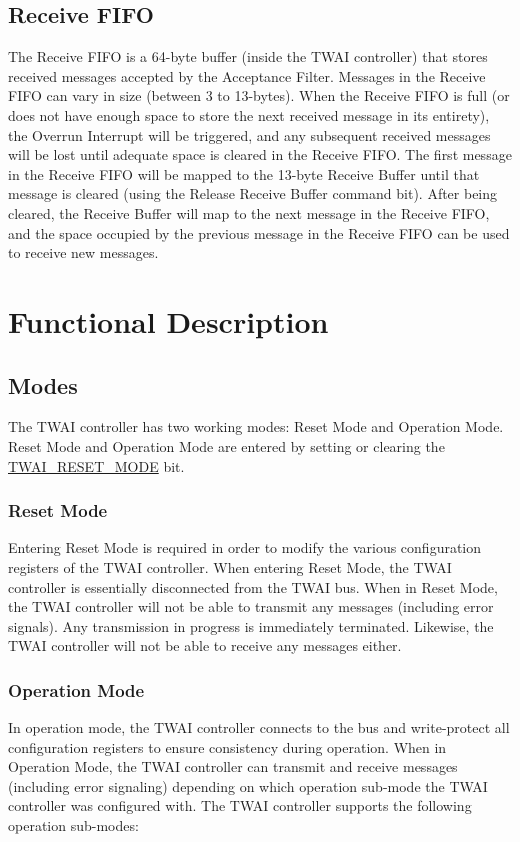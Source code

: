 \documentclass[main\_\_EN.tex]{subfiles}
\begin{document}
\subsection{Receive FIFO}
The Receive FIFO is a 64-byte buffer (inside the TWAI controller) that stores received messages accepted by the Acceptance Filter. Messages in the Receive FIFO can vary in size (between 3 to 13-bytes). When the Receive FIFO is full (or does not have enough space to store the next received message in its entirety), the Overrun Interrupt will be triggered, and any subsequent received messages will be lost until adequate space is cleared in the Receive FIFO. The first message in the Receive FIFO will be mapped to the 13-byte Receive Buffer until that message is cleared (using the Release Receive Buffer command bit). After being cleared, the Receive Buffer will map to the next message in the Receive FIFO, and the space occupied by the previous message in the Receive FIFO can be used to receive new messages.

\section{Functional Description}

\subsection{Modes}
\label{sec:twai-modes}
The \chipname{} TWAI controller has two working modes: Reset Mode and Operation Mode. Reset Mode and Operation Mode are entered by setting or clearing the \hyperref[fielddesc:TWAIRESETMODE]{TWAI\_RESET\_MODE} bit.

\subsubsection{Reset Mode}
Entering Reset Mode is required in order to modify the various configuration registers of the TWAI controller. When entering Reset Mode, the TWAI controller is essentially disconnected from the TWAI bus. When in Reset Mode, the TWAI controller will not be able to transmit any messages (including error signals). Any transmission in progress is immediately terminated. Likewise, the TWAI controller will not be able to receive any messages either.

\subsubsection{Operation Mode}
In operation mode, the TWAI controller connects to the bus and write-protect all configuration registers to ensure consistency during operation. When in Operation Mode, the TWAI controller can transmit and receive messages (including error signaling) depending on which operation sub-mode the TWAI controller was configured with. The TWAI controller supports the following operation sub-modes:
\end{document}
